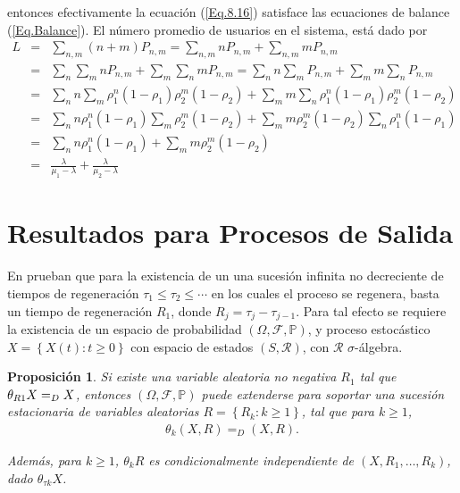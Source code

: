 \documentclass{article}
\newtheorem{Prop}{Proposición}[section]
\newcommand{\prob}{\mathbb{P}}
\numberwithin{equation}{section}
\begin{document}
entonces efectivamente la ecuaci\'on (\ref{Eq.8.16}) satisface las ecuaciones de balance (\ref{Eq.Balance}). El n\'umero promedio  de usuarios en el sistema, est\'a dado por
\begin{eqnarray*}
L&=&\sum_{n,m}\left(n+m\right)P_{n,m}=\sum_{n,m}nP_{n,m}+\sum_{n,m}mP_{n,m}\\
&=&\sum_{n}\sum_{m}nP_{n,m}+\sum_{m}\sum_{n}mP_{n,m}=\sum_{n}n\sum_{m}P_{n,m}+\sum_{m}m\sum_{n}P_{n,m}\\
&=&\sum_{n}n\sum_{m}\rho_{1}^{n}\left(1-\rho_{1}\right)\rho_{2}^{m}\left(1-\rho_{2}\right)+\sum_{m}m\sum_{n}\rho_{1}^{n}\left(1-\rho_{1}\right)\rho_{2}^{m}\left(1-\rho_{2}\right)\\
&=&\sum_{n}n\rho_{1}^{n}\left(1-\rho_{1}\right)\sum_{m}\rho_{2}^{m}\left(1-\rho_{2}\right)+\sum_{m}m\rho_{2}^{m}\left(1-\rho_{2}\right)\sum_{n}\rho_{1}^{n}\left(1-\rho_{1}\right)\\
&=&\sum_{n}n\rho_{1}^{n}\left(1-\rho_{1}\right)+\sum_{m}m\rho_{2}^{m}\left(1-\rho_{2}\right)\\
&=&\frac{\lambda}{\mu_{1}-\lambda}+\frac{\lambda}{\mu_{2}-\lambda}
\end{eqnarray*}


\section{Resultados para Procesos de Salida}

En \cite{Sigman2} prueban que para la existencia de un una sucesi\'on infinita no decreciente de tiempos de regeneraci\'on $\tau_{1}\leq\tau_{2}\leq\cdots$ en los cuales el proceso se regenera, basta un tiempo de regeneraci\'on $R_{1}$, donde $R_{j}=\tau_{j}-\tau_{j-1}$. Para tal efecto se requiere la existencia de un espacio de probabilidad $\left(\Omega,\mathcal{F},\prob\right)$, y proceso estoc\'astico $\textit{X}=\left\{X\left(t\right):t\geq0\right\}$ con espacio de estados $\left(S,\mathcal{R}\right)$, con $\mathcal{R}$ $\sigma$-\'algebra.

\begin{Prop}
Si existe una variable aleatoria no negativa $R_{1}$ tal que $\theta_{R\footnotesize{1}}X=_{D}X$, entonces $\left(\Omega,\mathcal{F},\prob\right)$ puede extenderse para soportar una sucesi\'on estacionaria de variables aleatorias $R=\left\{R_{k}:k\geq1\right\}$, tal que para $k\geq1$,
\begin{eqnarray*}
\theta_{k}\left(X,R\right)=_{D}\left(X,R\right).
\end{eqnarray*}

Adem\'as, para $k\geq1$, $\theta_{k}R$ es condicionalmente independiente de $\left(X,R_{1},\ldots,R_{k}\right)$, dado $\theta_{\tau k}X$.

\end{Prop}
\end{document}
